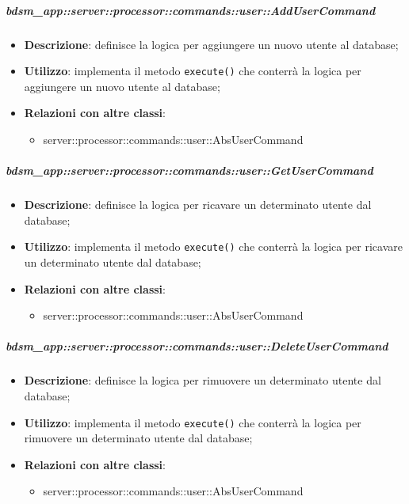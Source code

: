        \subparagraph{bdsm\_app::server::processor::commands::user::AddUserCommand} %
        \label{subp:bdsm_app_server_processor_commands_user_addusercommand}
        \begin{itemize}
          \item \textbf{Descrizione}: definisce la logica per aggiungere un nuovo utente al database;
          \item \textbf{Utilizzo}: implementa il metodo \texttt{execute()} che conterrà la logica per aggiungere un nuovo utente al database;
          \item \textbf{Relazioni con altre classi}:
            \begin{itemize}
              \item server::processor::commands::user::AbsUserCommand
            \end{itemize}
        \end{itemize}

        \subparagraph{bdsm\_app::server::processor::commands::user::GetUserCommand} %
        \label{subp:bdsm_app_server_processor_commands_user_getusercommand}
        \begin{itemize}
          \item \textbf{Descrizione}: definisce la logica per ricavare un determinato utente dal database;
          \item \textbf{Utilizzo}: implementa il metodo \texttt{execute()} che conterrà la logica per ricavare un determinato utente dal database;
          \item \textbf{Relazioni con altre classi}:
            \begin{itemize}
              \item server::processor::commands::user::AbsUserCommand
            \end{itemize}
        \end{itemize}

        \subparagraph{bdsm\_app::server::processor::commands::user::DeleteUserCommand} %
        \label{subp:bdsm_app_server_processor_commands_user_deleteusercommand}
        \begin{itemize}
          \item \textbf{Descrizione}: definisce la logica per rimuovere un determinato utente dal database;
          \item \textbf{Utilizzo}: implementa il metodo \texttt{execute()} che conterrà la logica per rimuovere un determinato utente dal database;
          \item \textbf{Relazioni con altre classi}:
            \begin{itemize}
              \item server::processor::commands::user::AbsUserCommand
            \end{itemize}
        \end{itemize}

